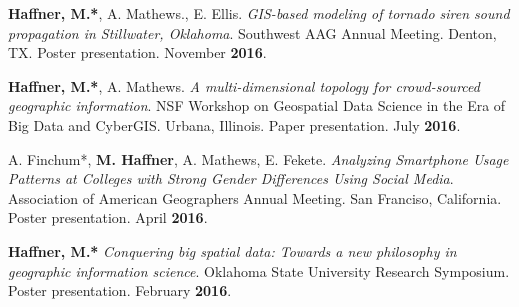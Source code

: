 \begin{cventries}
   \cventry
      {}
      {}
      {}
      {}
      {
        \begin{cvitems}
          \vspace{-2mm}
            \item {\textbf{Haffner, M.*}, A. Mathews., E. Ellis.
                \textit{GIS-based modeling of tornado siren sound propagation in
                  Stillwater, Oklahoma}. Southwest AAG Annual Meeting. Denton,
                TX. Poster  presentation. November \textbf{2016}.}
            \end{cvitems}
          }
   \cventry
      {}
      {}
      {}
      {}
      {
        \begin{cvitems}
          \vspace{-2mm}
        \item {\textbf{Haffner, M.*}, A. Mathews. \textit{A multi-dimensional topology for crowd-sourced geographic information}. NSF Workshop on Geospatial Data Science in the Era of Big Data and CyberGIS. Urbana, Illinois. Paper presentation. July \textbf{2016}.} 
          \end{cvitems}
              }
   \cventry
      {}
      {}
      {}
      {}
      {
        \begin{cvitems}
          \vspace{-2mm}
        \item A. Finchum*, {\textbf{M. Haffner}, A. Mathews, E. Fekete. \textit{Analyzing Smartphone Usage Patterns at Colleges with Strong Gender Differences Using Social Media}. Association of American Geographers Annual Meeting. San Franciso, California. Poster presentation. April \textbf{2016}.} 
            \end{cvitems}
            }
   \cventry
      {}
      {}
      {}
      {}
      {
        \begin{cvitems}
          \vspace{-2mm}
            \item {\textbf{Haffner, M.*} \textit{Conquering big spatial data: Towards a new philosophy in geographic information science}. Oklahoma State University Research Symposium. Poster presentation. February \textbf{2016}.}   
              \end{cvitems}
            }
   \cventry
      {}
      {}
      {}
      {}
      {
        \begin{cvitems}
          \vspace{-2mm}

\end{cvitems}}
\end{cventries}
